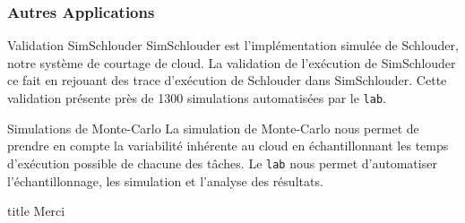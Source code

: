 \documentclass{beamer}
\newcommand{\lab}{\texttt{lab}}
\begin{document}
\begin{frame}
	\frametitle{Autres Applications}
	\begin{block}{Validation SimSchlouder}
		SimSchlouder est l'implémentation simulée de Schlouder, notre
		système de courtage de cloud. La validation de l'exécution de
		SimSchlouder ce fait en rejouant des trace d'exécution de
		Schlouder dans SimSchlouder. Cette validation présente près de
		1300 simulations automatisées par le \lab.
	\end{block}
	\begin{block}{Simulations de Monte-Carlo}
		La simulation de Monte-Carlo nous permet de prendre en compte la
		variabilité inhérente au cloud en échantillonnant les temps
		d'exécution possible de chacune des tâches. Le \lab{} nous 
		permet d'automatiser l'échantillonnage, les simulation et 
		l'analyse des résultats.
	\end{block}
\end{frame}

\begin{frame}
	\begin{beamercolorbox}[sep=8pt,center,shadow=true,rounded=true]{title}
		Merci\par
	\end{beamercolorbox}
\end{frame}
\end{document}
